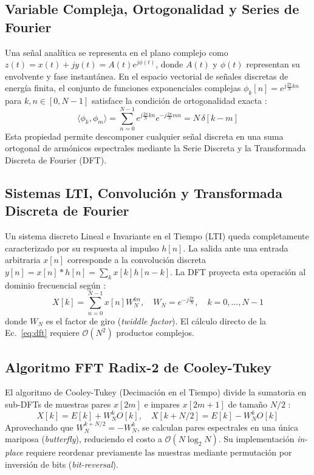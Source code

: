 \documentclass[journal]{IEEEtran}
\begin{document}
\subsection{Variable Compleja, Ortogonalidad y Series de Fourier}
Una se\~nal anal\'itica se representa en el plano complejo como $z(t) = x(t) + j y(t) = A(t) e^{j\phi(t)}$, donde $A(t)$ y $\phi(t)$ representan su envolvente y fase instant\'anea. En el espacio vectorial de se\~nales discretas de energ\'ia finita, el conjunto de funciones exponenciales complejas $\phi_k[n] = e^{j \frac{2\pi}{N} k n}$ para $k, n \in [0, N-1]$ satisface la condici\'on de ortogonalidad exacta \cite{Oppenheim2010}:
\begin{equation} \label{eq:ortogonalidad}
\langle \phi_k, \phi_m \rangle = \sum_{n=0}^{N-1} e^{j \frac{2\pi}{N} k n} e^{-j \frac{2\pi}{N} m n} = N \, \delta[k - m]
\end{equation}
Esta propiedad permite descomponer cualquier se\~nal discreta en una suma ortogonal de arm\'onicos espectrales mediante la Serie Discreta y la Transformada Discreta de Fourier (DFT).

\subsection{Sistemas LTI, Convoluci\'on y Transformada Discreta de Fourier}
Un sistema discreto Lineal e Invariante en el Tiempo (LTI) queda completamente caracterizado por su respuesta al impulso $h[n]$. La salida ante una entrada arbitraria $x[n]$ corresponde a la convoluci\'on discreta $y[n] = x[n] * h[n] = \sum_{k} x[k] h[n-k]$. La DFT proyecta esta operaci\'on al dominio frecuencial seg\'un \cite{Proakis2007}:
\begin{equation} \label{eq:dft}
X[k] = \sum_{n=0}^{N-1} x[n] W_N^{kn}, \quad W_N = e^{-j\frac{2\pi}{N}}, \quad k=0,\dots,N-1
\end{equation}
donde $W_N$ es el factor de giro (\textit{twiddle factor}). El c\'alculo directo de la Ec.~\eqref{eq:dft} requiere $\mathcal{O}(N^2)$ productos complejos.

\subsection{Algoritmo FFT Radix-2 de Cooley-Tukey}
El algoritmo de Cooley-Tukey (Decimaci\'on en el Tiempo) divide la sumatoria en sub-DFTs de muestras pares $x[2m]$ e impares $x[2m+1]$ de tama\~no $N/2$ \cite{CooleyTukey1965}:
\begin{equation} \label{eq:fft_butterfly}
X[k] = E[k] + W_N^k O[k], \quad X[k + N/2] = E[k] - W_N^k O[k]
\end{equation}
Aprovechando que $W_N^{k + N/2} = -W_N^k$, se calculan pares espectrales en una \'unica mariposa (\textit{butterfly}), reduciendo el costo a $\mathcal{O}(N \log_2 N)$. Su implementaci\'on \textit{in-place} requiere reordenar previamente las muestras mediante permutaci\'on por inversi\'on de bits (\textit{bit-reversal}).
\end{document}
